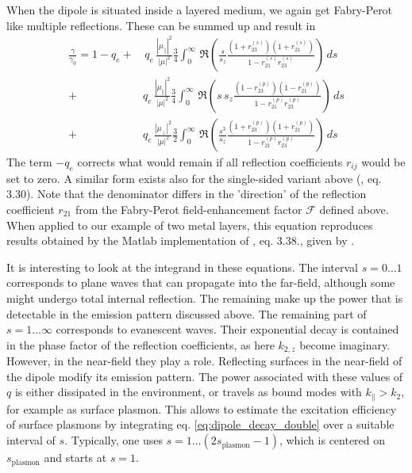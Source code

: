 When the dipole is situated inside a layered medium, we again get Fabry-Perot like multiple reflections. These can be summed up and result in
\begin{align} 
\frac{\gamma}{\gamma_0} = 1 - q_e + & \, q_e \, \frac{| \mu_\parallel|^2}{|\mu|^2} \frac{3}{4}
\int_0^\infty \, \Re \left( 
\frac{s}{s_z} \frac{(1 + r_{23}^{(s)} ) (1 +  r_{21}^{(s)} ) }{1 -  r_{21}^{(s)}  r_{23}^{(s)} } 
\right) \, ds \label{eq:dipole_decay_double} \\
+ &q_e \, \frac{| \mu_\parallel|^2}{|\mu|^2} \frac{3}{4}
\int_0^\infty \, \Re  \left( 
s \, s_z \frac{(1 - r_{23}^{(p)} ) (1 -  r_{21}^{(p)} ) }{1 -  r_{21}^{(p)}  r_{23}^{(p)} } 
\right) \, ds \nonumber \\
+ & q_e \,\frac{| \mu_\perp|^2}{|\mu|^2} \frac{3}{2}
\int_0^\infty \, \Re \left( 
\frac{s^3}{s_z} \frac{(1 + r_{23}^{(p)} ) (1 +  r_{21}^{(p)} ) }{1 -  r_{21}^{(p)}  r_{23}^{(p)} } 
\right) \, ds  \nonumber  
\end{align}
The term $-q_e$ corrects what would remain if all reflection coefficients $r_{ij}$ would be set to zero. A similar form exists also for the single-sided variant above
(\cite{Ford_Weber_84}, eq. 3.30). Note that the denominator differs in the 'direction' of the reflection coefficient $r_{21}$ from the Fabry-Perot field-enhancement factor $\mathcal{F}$ defined above. When applied to our example of two metal layers, this equation reproduces results obtained by the Matlab implementation of \cite{Ford_Weber_84}, eq. 3.38., given by \cite{Jun10_thesis}.


It is interesting to look at the integrand in these equations. The interval $s = 0 \dots 1$ corresponds to plane waves that can propagate into the far-field, although some might undergo total internal reflection. The remaining make up the power that is detectable in the emission pattern discussed above. The remaining part of $s = 1 \dots \infty$ corresponds to evanescent waves. Their exponential decay is contained in the phase factor of the reflection coefficients, as here $k_{2,z}$ become imaginary. However, in the near-field they play a role. Reflecting surfaces in the near-field of the dipole modify its emission pattern. The power associated with these values of $q$ is either dissipated in the environment, or travels as bound modes with $k_\parallel > k_2$, for example as surface plasmon. This allows to estimate the excitation efficiency of surface plasmons by integrating eq. \ref{eq:dipole_decay_double} over a suitable interval of $s$. Typically, one uses $s = 1 \dots (2 s_\text{plasmon} - 1)$, which is centered on $s_\text{plasmon}$ and starts at $s=1$.



